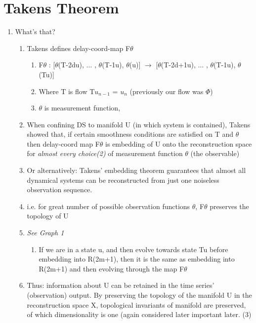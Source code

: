 \documentclass[12pt, oneside]{article}
\theoremstyle{definition}
\begin{document}
\section{Takens Theorem}
\begin{enumerate}
  \item What's that?
  \begin{enumerate}
        \item Takens defines delay-coord-map F$\theta$
        \begin{enumerate}
              \item F$\theta$ : [$\theta$(T-2du), $\ldots$ , $\theta$(T-1u), $\theta$(u)] $\rightarrow$ [$\theta$(T-2d+1u), $\ldots$ , $\theta$(T-1u), $\theta$(Tu)]
              \item Where T is flow T$u_{n-1}$ = $u_{n}$ (previously our flow was $\Phi$)
              \item $\theta$ is measurement function,
        \end{enumerate}  
        \item When confining DS to manifold U (in which system is contained), Takens showed
        that, if certain smoothness conditions are satisfied on T and $\theta$ then delay-coord
        map F$\theta$ is embedding of U onto the reconstruction space for \emph{almost every
        choice(2)} of measurement function $\theta$ (the observable)
        \item Or alternatively: Takens' embedding theorem guarantees that almost all
        dynamical systems can be reconstructed from just one noiseless observation
        sequence.
        \item i.e. for great number of possible observation functions $\theta$, F$\theta$ preserves the
        topology of U
        \item \emph {See Graph 1 }
        \begin{enumerate}
          \item If we are in a state u, and then evolve towards state Tu before  embedding into R(2m+1), then it is the same as embedding into R(2m+1) and then evolving through the map F$\theta$
        \end{enumerate}
        \item Thus: information about U can be retained in the time series’ (observation)
        output. By preserving the topology of the manifold U in the reconstruction space
        X, topological invariants of manifold are preserved, of which dimensionality is
        one (again considered later important later. (3)

\end{enumerate}
\end{enumerate}
\end{document}
